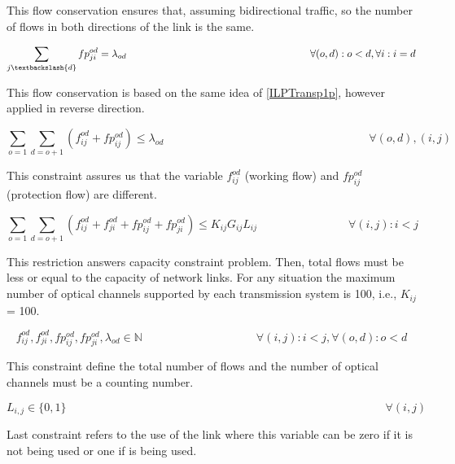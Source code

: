 This flow conservation ensures that, assuming bidirectional traffic, so the number of flows in both directions of the link is the same.

\begin{equation}
\sum_{j\textbackslash \{d\}} fp_{ji}^{od} = \lambda_{od} \qquad \qquad \qquad \qquad \qquad \qquad \qquad \qquad \qquad
\forall(o,d) : o < d, \forall i: i = d
\label{ILPTransp3p}
\end{equation}

This flow conservation is based on the same idea of \ref{ILPTransp1p}, however applied in reverse direction.

\begin{equation}
\sum_{o=1} \sum_{d=o+1} \left(f_{ij}^{od}  + fp_{ij}^{od}\right) \leq \lambda_{od}  \qquad \qquad \qquad \qquad \qquad \qquad \qquad \qquad \qquad
\forall (o,d), (i,j)
\label{ILPTransp4p}
\end{equation}

This constraint assures us that the variable $f_{ij}^{od}$ (working flow) and $fp_{ij}^{od}$ (protection flow) are different.

\begin{equation}
\sum_{o=1} \sum_{d=o+1} \left(f_{ij}^{od} + f_{ji}^{od} + fp_{ij}^{od} + fp_{ji}^{od}\right) \leq K_{ij} G_{ij} L_{ij} \qquad \qquad \qquad \qquad
\forall(i,j) : i < j
\label{ILPTransp4}
\end{equation}

This restriction answers capacity constraint problem. Then, total flows must be less or equal to the capacity of network links. For any situation the maximum number of optical channels supported by each transmission system is 100, i.e., $K_{ij}$ = 100.

\begin{equation}
f_{ij}^{od} , f_{ji}^{od} , fp_{ij}^{od} , fp_{ji}^{od} , \lambda_{od} \in \mathbb{N}   \qquad \qquad \qquad \qquad \qquad
\forall(i,j) : i < j, \forall(o,d) : o < d
\label{ILPTransp5}
\end{equation}

This constraint define the total number of flows and the number of optical channels must be a counting number.

\begin{equation}
L_{i,j} \in \{0,1\} \qquad \qquad \qquad \qquad \qquad \qquad \qquad \qquad \qquad \qquad \qquad \qquad \qquad \qquad
\forall(i,j)
\label{ILPTranspL1}
\end{equation}

Last constraint refers to the use of the link where this variable can be zero if it is not being used or one if is being used.\\


